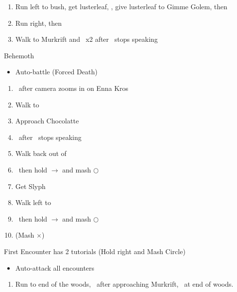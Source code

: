 \begin{enumerate}[resume]
	\item Run left to bush, get lusterleaf, \cs, give lusterleaf to Gimme Golem, then \cs\
	\item Run right, then 
	\item Walk to Murkrift and \cs\ x2 after \reynn\ stops speaking
\end{enumerate}
\begin{battle}[]{Behemoth}
	\begin{itemize}
		\item Auto-battle (Forced Death)
	\end{itemize}
\end{battle}
\begin{enumerate}[resume]
	\item \cs\ after camera zooms in on Enna Kros
	\item Walk to 
	\item Approach Chocolatte
	\item \cs\ after \reynn\ stops speaking
	\item Walk back out of 
	\item \cs\ then hold $\rightarrow$ and mash $\bigcirc$
	\item Get Slyph
	\item Walk left to 
	\item \cs\ then hold $\rightarrow$ and mash $\bigcirc$
	\item {} (Mash $\times$)
\end{enumerate}
\begin{encounters}
First Encounter has 2 tutorials (Hold right and Mash Circle)
	\begin{itemize}
		\item Auto-attack all encounters
	\end{itemize}
\end{encounters}
\begin{enumerate}[resume]
	\item Run to end of the woods, \cs\ after approaching Murkrift, \unskippablecs\ at end of woods.
\end{enumerate}